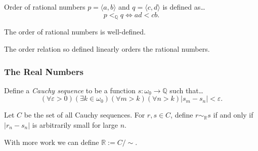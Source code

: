 \noindent Order of rational numbers $p = \langle a, b \rangle$ and $q = \langle c, d \rangle$ is defined as\dots
$$p <_{\mathbb{Q}} q \Leftrightarrow ad < cb.$$

\begin{lemma}
The order of rational numbers is well-defined.
\end{lemma}

\noindent The order relation so defined linearly orders the rational numbers.

\subsubsection{The Real Numbers}\label{realnumbers}

\label{realnumberswithcauchysequences}

Define a \emph{Cauchy sequence} to be a function $s: \omega_0 \rightarrow \mathbb{Q}$ such that\dots
$$(\forall \varepsilon > 0)(\exists k \in \omega_0)(\forall m > k)(\forall n > k) |s_m - s_n| < \varepsilon.$$

\noindent Let $C$ be the set of all Cauchy sequences. For $r,s \in C$, define $r \sim_{\mathbb{R}} s$ if and only if $|r_n - s_n|$
is arbitrarily small for large $n$.\newline

\noindent With more work we can define $\mathbb{R} := C / \sim$.

\label{realnumberswithcauchysequence}


